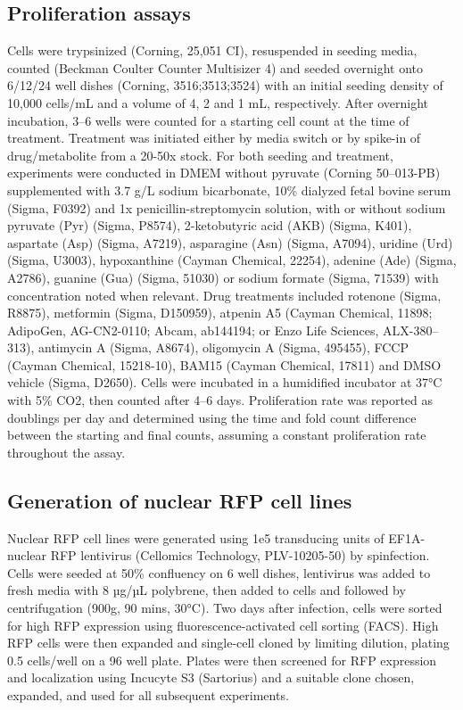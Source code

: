 \subsection{Proliferation assays}
Cells were trypsinized (Corning, 25,051 CI), resuspended in seeding media, counted (Beckman Coulter Counter Multisizer 4) and seeded overnight onto 6/12/24 well dishes (Corning, 3516;3513;3524) with an initial seeding density of 10,000 cells/mL and a volume of 4, 2 and 1 mL, respectively.
After overnight incubation, 3–6 wells were counted for a starting cell count at the time of treatment.
Treatment was initiated either by media switch or by spike-in of drug/metabolite from a 20-50x stock.
For both seeding and treatment, experiments were conducted in DMEM without pyruvate (Corning 50–013-PB) supplemented with 3.7 g/L sodium bicarbonate, 10\% dialyzed fetal bovine serum (Sigma, F0392) and 1x penicillin-streptomycin solution, with or without sodium pyruvate (Pyr) (Sigma, P8574),
2-ketobutyric acid (AKB) (Sigma, K401),
aspartate (Asp) (Sigma, A7219),
asparagine (Asn) (Sigma, A7094),
uridine (Urd) (Sigma, U3003), hypoxanthine (Cayman Chemical, 22254),
adenine (Ade) (Sigma, A2786),
guanine (Gua) (Sigma, 51030) or sodium formate (Sigma, 71539) with concentration noted when relevant.
Drug treatments included rotenone (Sigma, R8875),
metformin (Sigma, D150959),
atpenin A5 (Cayman Chemical, 11898; AdipoGen, AG-CN2-0110; Abcam, ab144194; or Enzo Life Sciences, ALX-380–313),
antimycin A (Sigma, A8674),
oligomycin A (Sigma, 495455),
FCCP (Cayman Chemical, 15218-10),
BAM15 (Cayman Chemical, 17811)
and DMSO vehicle (Sigma, D2650).
Cells were incubated in a humidified incubator at 37°C with 5\% CO2, then counted after 4–6 days.
Proliferation rate was reported as doublings per day and determined using the time and fold count difference between the starting and final counts, assuming a constant proliferation rate throughout the assay.


\subsection{Generation of nuclear RFP cell lines}
Nuclear RFP cell lines were generated using 1e5 transducing units of EF1A-nuclear RFP lentivirus (Cellomics Technology, PLV-10205-50) by spinfection.
Cells were seeded at 50\% confluency on 6 well dishes, lentivirus was added to fresh media with 8 µg/µL polybrene, then added to cells and followed by centrifugation (900g, 90 mins, 30°C).
Two days after infection, cells were sorted for high RFP expression using fluorescence-activated cell sorting (FACS).
High RFP cells were then expanded and single-cell cloned by limiting dilution, plating 0.5 cells/well on a 96 well plate.
Plates were then screened for RFP expression and localization using Incucyte S3 (Sartorius) and a suitable clone chosen, expanded, and used for all subsequent experiments.


